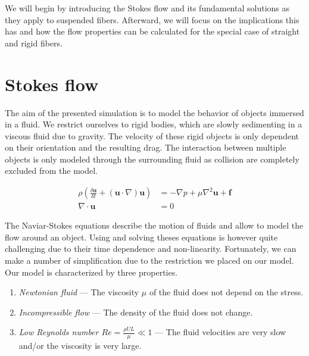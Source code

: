 \documentclass[a4paper,11pt]{kth-mag}
\begin{document}
We will begin by introducing the Stokes flow and its fundamental solutions as they apply to suspended fibers. Afterward, we will focus on the implications this has and how the flow properties can be calculated for the special case of straight and rigid fibers.

\section{Stokes flow}

The aim of the presented simulation is to model the behavior of objects immersed in a fluid. We restrict ourselves to rigid bodies, which are slowly sedimenting in a viscous fluid due to gravity. The velocity of these rigid objects is only dependent on their orientation and the resulting drag. The interaction between multiple objects is only modeled through the surrounding fluid as collision are completely excluded from the model.

\begin{equation}
  \label{eq:naviar_stokes_equations}
  \begin{aligned}
    \rho(\frac{\delta \mathbf{u}}{\delta t} + (\mathbf{u} \cdot \nabla)\mathbf{u}) &= -\nabla p + \mu\nabla^2\mathbf{u} + \mathbf{f} \\
    \nabla \cdot \mathbf{u} &= 0
  \end{aligned}
\end{equation}

The Naviar-Stokes equations describe the motion of fluids and allow to model the flow around an object. Using and solving theses equations is however quite challenging due to their time dependence and non-linearity. Fortunately, we can make a number of simplification due to the restriction we placed on our model. Our model is characterized by three properties.

\begin{enumerate}
  \item{\textit{Newtonian fluid} — The viscosity $\mu$ of the fluid does not depend on the stress.}
  \item{\textit{Incompressible flow} — The density of the fluid does not change.}
  \item{\textit{Low Reynolds number $Re = \frac{\rho U L}{\mu} \ll 1$} — The fluid velocities are very slow and/or the viscosity is very large.}
\end{enumerate}
\end{document}
